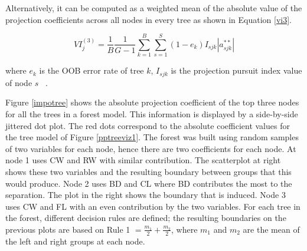 \documentclass[smallextended,natbib]{svjour3}\usepackage[]{graphicx}\usepackage[]{xcolor}
\begin{document}
Alternatively, it can be computed as a weighted mean of the absolute value of the projection coefficients across all nodes in every tree as shown in Equation \ref{vi3}.

\begin{equation}
VI^{(3)}_j=\frac{1}{B}\frac{1}{G-1}\sum_{k=1}^B\sum_{s = 1}^{S} (1-e_k) I_{sjk}|a^{**}_{sjk}|
\label{vi3}
\end{equation}

\noindent where $e_k$ is the OOB error rate of tree $k$, $I_{sjk}$ is the projection pursuit index value of node $s$ ~\citep{da2021projection}.

Figure \ref{impotree} shows the absolute projection coefficient of the top three nodes for all the trees in a forest model. This information is displayed by a side-by-side jittered dot plot. The red dots correspond to the absolute coefficient values for the tree model of Figure \ref{pptreeviz1}. The forest was built using random samples of two variables for each node, hence there are two coefficients for each node. At node 1 uses CW and RW with similar contribution. The scatterplot at right shows these two variables and the resulting boundary between groups that this would produce. Node 2 uses BD and CL where BD contributes the most to the separation. The plot in the right shows the boundary that is induced. Node 3 uses CW and FL with an even contribution by the two variables.
For each tree in the forest, different decision rules are defined; the resulting boundaries on the previous plots are based on Rule 1 $= \frac{m_1}{2} + \frac{m_2}{2} $, where $m_1$ and $m_2$ are the mean of the left and right groups at each node.
\end{document}
